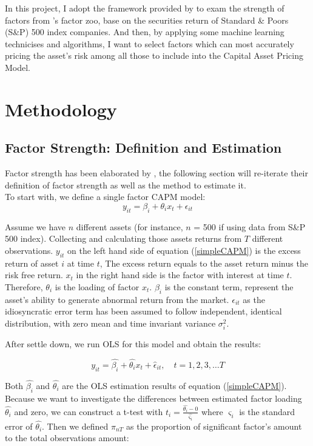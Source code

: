 \documentclass[12pt]{article}
\begin{document}
In this project, I adopt the framework provided by  to exam the strength of factors from \citeauthor{Harvey2019}'s factor zoo, base on the securities return of Standard \& Poors (S\&P) 500 index companies. 
And then, by applying some machine learning technicises and algorithms,  I want to select factors which can most accurately pricing the asset's risk among all those to include into the Capital Asset Pricing Model.

	\section{Methodology}\label{Method}
	\subsection{Factor Strength: Definition and Estimation}\label{strength}
Factor strength has been elaborated by , the following section will re-iterate their definition of factor strength as well as the method to estimate it.\\
To start with, we define a single factor CAPM model:
\[  y_{it} = \beta_i + \theta_{i}x_t + \epsilon_{it}  \tag{1}\label{simpleCAPM} \]

Assume we have $n$ different assets (for instance, $n$ = 500 if using data from S\&P 500 index). 
Collecting and calculating those assets returns from $T$ different observations. 
$y_{it}$ on the left hand side of equation (\ref{simpleCAPM}) is the excess return of asset $i$ at time $t$, The excess return equals to the asset return minus the risk free return. 
$x_t$  in the right hand side is the factor with interest at time $t$. 
Therefore, $\theta_{i}$ is the loading of factor $x_{t}$. 
$\beta_{i}$ is the constant term, represent the asset's ability to generate abnormal return from the market. 
$\epsilon_{it}$ as the idiosyncratic error term has been assumed to follow independent, identical distribution, with zero mean and time invariant variance  $\sigma_i^2$.


After settle down, we run OLS for this model and obtain the results:

\[ y_{it} =\hat{\beta_i} + \hat{\theta_{i}}x_t + \hat{\epsilon}_{it}, \quad t = 1, 2, 3, \dots  T     \]

Both $\hat{\beta_i}$ and $\hat{\theta_{i}}$ are the OLS estimation results of equation  (\ref{simpleCAPM}). 
Because we want to investigate the differences between estimated factor loading $\hat{\theta_{i}}$ and zero, we can construct a t-test with $t_{i} = \frac{\hat{\theta_{i}} - 0}{\hat{\varsigma_{i}}}$ where $\varsigma_{i}$ is the standard error of $\hat{\theta_{i}}$.  
Then we defined $\pi_{nT}$ as the proportion of significant factor's amount to the total observations amount:
\end{document}
